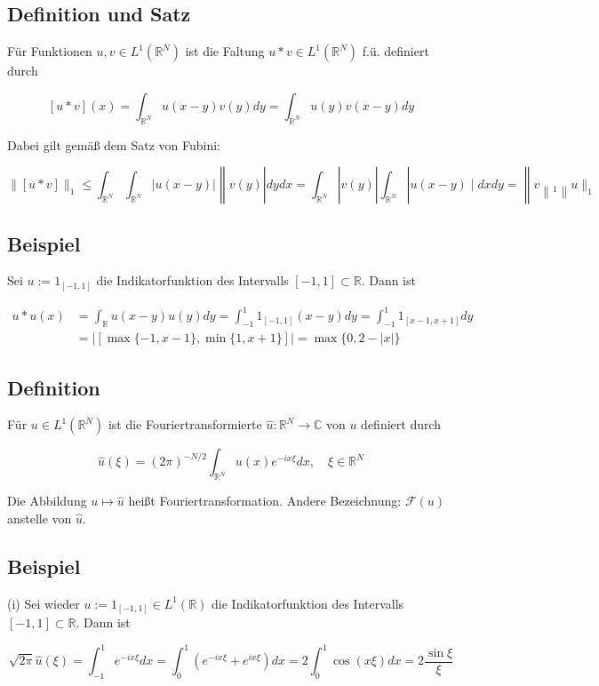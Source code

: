 \documentclass[10pt, letterpaper]{article}
\begin{document}
\subsection*{Definition und Satz}
Für Funktionen $u, v \in L^{1}\left(\mathbb{R}^{N}\right)$ ist die Faltung $u * v \in L^{1}\left(\mathbb{R}^{N}\right)$ f.ü. definiert durch

$$
[u * v](x)=\int_{\mathbb{R}^{N}} u(x-y) v(y) d y=\int_{\mathbb{R}^{N}} u(y) v(x-y) d y
$$

Dabei gilt gemäß dem Satz von Fubini:

$$
\|[u * v]\|_{1} \leq \int_{\mathbb{R}^{N}} \int_{\mathbb{R}^{N}}|u(x-y)|\left\|v(y)\left|d y d x=\int_{\mathbb{R}^{N}}\right| v(y)\left|\int_{\mathbb{R}^{N}}\right| u(x-y) \mid d x d y=\right\| v\left\|_{1}\right\| u \|_{1}
$$

\subsection*{Beispiel}
Sei $u:=1_{[-1,1]}$ die Indikatorfunktion des Intervalls $[-1,1] \subset \mathbb{R}$. Dann ist

$$
\begin{aligned}
u * u(x) & =\int_{\mathbb{R}} u(x-y) u(y) d y=\int_{-1}^{1} 1_{[-1,1]}(x-y) d y=\int_{-1}^{1} 1_{[x-1, x+1]} d y \\
& =|[\max \{-1, x-1\}, \min \{1, x+1\}]|=\max \{0,2-|x|\}
\end{aligned}
$$

\subsection*{Definition}
Für $u \in L^{1}\left(\mathbb{R}^{N}\right)$ ist die Fouriertransformierte $\hat{u}: \mathbb{R}^{N} \rightarrow \mathbb{C}$ von $u$ definiert durch

$$
\hat{u}(\xi)=(2 \pi)^{-N / 2} \int_{\mathbb{R}^{N}} u(x) e^{-i x \xi} d x, \quad \xi \in \mathbb{R}^{N}
$$

Die Abbildung $u \mapsto \hat{u}$ heißt Fouriertransformation. Andere Bezeichnung: $\mathcal{F}(u)$ anstelle von $\hat{u}$.

\subsection*{Beispiel}
(i) Sei wieder $u:=1_{[-1,1]} \in L^{1}(\mathbb{R})$ die Indikatorfunktion des Intervalls $[-1,1] \subset \mathbb{R}$. Dann ist

$$
\sqrt{2 \pi} \hat{u}(\xi)=\int_{-1}^{1} e^{-i x \xi} d x=\int_{0}^{1}\left(e^{-i x \xi}+e^{i x \xi}\right) d x=2 \int_{0}^{1} \cos (x \xi) d x=2 \frac{\sin \xi}{\xi}
$$
\end{document}
